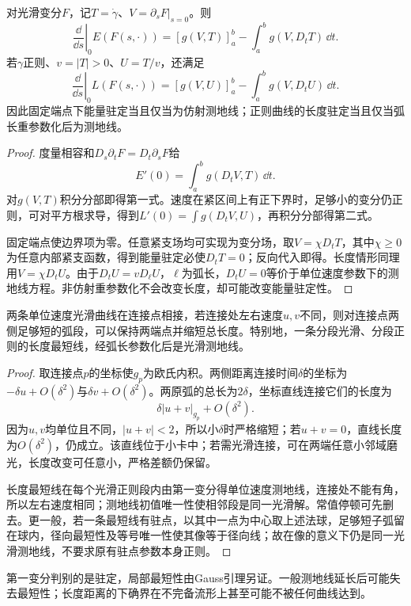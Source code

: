 \begin{theorem}[能量与长度的第一变分]\label{thm:first-variation}
对光滑变分$F$，记$T=\dot\gamma$、$V=\partial_sF|_{s=0}$。则
\[
 \left.\frac{\dd}{\dd s}\right|_0E(F(s,\cdot))
 =[g(V,T)]_a^b-\int_a^b g(V,D_tT)\,\dd t.
\]
若$\gamma$正则、$v=|T|>0$、$U=T/v$，还满足
\[
 \left.\frac{\dd}{\dd s}\right|_0L(F(s,\cdot))
 =[g(V,U)]_a^b-\int_a^b g(V,D_tU)\,\dd t.
\]
因此固定端点下能量驻定当且仅当为仿射测地线；正则曲线的长度驻定当且仅当弧长重参数化后为测地线。
\end{theorem}
\begin{proof}
度量相容和$D_s\partial_tF=D_t\partial_sF$给
\[
 E'(0)=\int_a^b g(D_tV,T)\,\dd t.
\]
对$g(V,T)$积分分部即得第一式。速度在紧区间上有正下界时，足够小的变分仍正则，可对平方根求导，得到$L'(0)=\int g(D_tV,U)$，再积分分部得第二式。

固定端点使边界项为零。任意紧支场均可实现为变分场，取$V=\chi D_tT$，其中$\chi\geq0$为任意内部紧支函数，得到能量驻定必使$D_tT=0$；反向代入即得。长度情形同理用$V=\chi D_tU$。由于$D_tU=vD_\ell U$，$\ell$为弧长，$D_tU=0$等价于单位速度参数下的测地线方程。非仿射重参数化不会改变长度，却可能改变能量驻定性。
\end{proof}

\begin{lemma}[最短折线不能有角]\label{lem:no-geodesic-corner}
两条单位速度光滑曲线在连接点相接，若连接处左右速度$u,v$不同，则对连接点两侧足够短的弧段，可以保持两端点并缩短总长度。特别地，一条分段光滑、分段正则的长度最短线，经弧长参数化后是光滑测地线。
\end{lemma}
\begin{proof}
取连接点$p$的坐标使$g_p$为欧氏内积。两侧距离连接时间$\delta$的坐标为$-\delta u+O(\delta^2)$与$\delta v+O(\delta^2)$。两原弧的总长为$2\delta$，坐标直线连接它们的长度为
\[
 \delta|u+v|_{g_p}+O(\delta^2).
\]
因为$u,v$均单位且不同，$|u+v|<2$，所以小$\delta$时严格缩短；若$u+v=0$，直线长度为$O(\delta^2)$，仍成立。该直线位于小卡中；若需光滑连接，可在两端任意小邻域磨光，长度改变可任意小，严格差额仍保留。

长度最短线在每个光滑正则段内由第一变分得单位速度测地线，连接处不能有角，所以左右速度相同；测地线初值唯一性使相邻段是同一光滑解。常值停顿可先删去。更一般，若一条最短线有驻点，以其中一点为中心取上述法球，足够短子弧留在球内，径向最短性及等号唯一性使其像等于径向线；故在像的意义下仍是同一光滑测地线，不要求原有驻点参数本身正则。
\end{proof}

第一变分判别的是驻定，局部最短性由Gauss引理另证。一般测地线延长后可能失去最短性；长度距离的下确界在不完备流形上甚至可能不被任何曲线达到。

